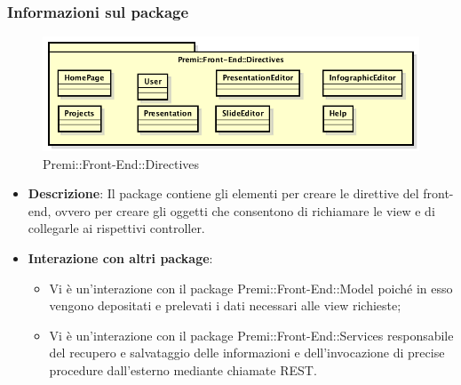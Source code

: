 \subsubsection*{Informazioni sul package}
\begin{figure}[h]
	\centering
	\includegraphics[width=0.9\linewidth]{img/front-end_directives}
	\caption[Premi::Front-End::Directives]{Premi::Front-End::Directives}
\end{figure}
\begin{itemize}
	\item \textbf{Descrizione}: Il package contiene gli elementi per creare le direttive del \gls{front-end}, ovvero per creare gli oggetti che consentono di richiamare le view e di collegarle ai rispettivi controller.
	\item \textbf{Interazione con altri package}:
	\begin{itemize}
		\item Vi è un'interazione con il package Premi::Front-End::Model poiché in esso vengono depositati e prelevati i dati necessari alle view richieste;
		\item Vi è un'interazione con il package Premi::Front-End::Services responsabile del recupero e salvataggio delle informazioni e dell'invocazione di precise procedure dall'esterno mediante chiamate REST.
	\end{itemize}
\end{itemize}


